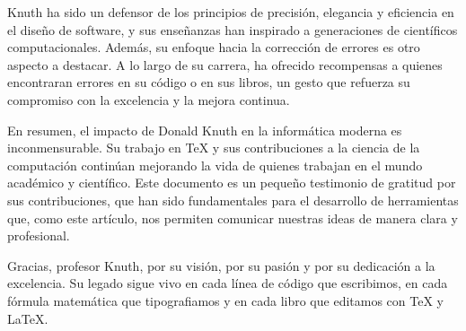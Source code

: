 Knuth ha sido un defensor de los principios de precisión, elegancia y eficiencia en el diseño de software, y sus enseñanzas han inspirado a generaciones de científicos computacionales. Además, su enfoque hacia la corrección de errores es otro aspecto a destacar. A lo largo de su carrera, ha ofrecido recompensas a quienes encontraran errores en su código o en sus libros, un gesto que refuerza su compromiso con la excelencia y la mejora continua.

En resumen, el impacto de Donald Knuth en la informática moderna es inconmensurable. Su trabajo en \TeX{} y sus contribuciones a la ciencia de la computación continúan mejorando la vida de quienes trabajan en el mundo académico y científico. Este documento es un pequeño testimonio de gratitud por sus contribuciones, que han sido fundamentales para el desarrollo de herramientas que, como este artículo, nos permiten comunicar nuestras ideas de manera clara y profesional.

Gracias, profesor Knuth, por su visión, por su pasión y por su dedicación a la excelencia. Su legado sigue vivo en cada línea de código que escribimos, en cada fórmula matemática que tipografiamos y en cada libro que editamos con \TeX{} y \LaTeX{}.

